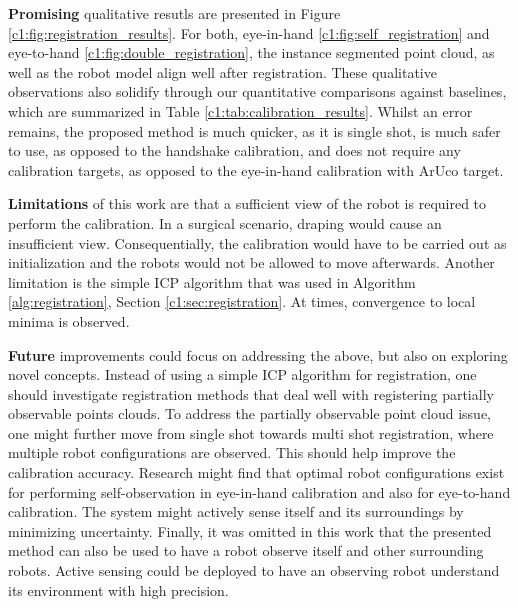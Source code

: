 \textbf{Promising} qualitative resutls are presented in Figure \ref{c1:fig:registration_results}. For both, eye-in-hand \ref{c1:fig:self_registration} and eye-to-hand \ref{c1:fig:double_registration}, the instance segmented point cloud, as well as the robot model align well after registration. These qualitative observations also solidify through our quantitative comparisons against baselines, which are summarized in Table \ref{c1:tab:calibration_results}. Whilst an error remains, the proposed method is much quicker, as it is single shot, is much safer to use, as opposed to the handshake calibration, and does not require any calibration targets, as opposed to the eye-in-hand calibration with ArUco target.

\textbf{Limitations} of this work are that a sufficient view of the robot is required to perform the calibration. In a surgical scenario, draping would cause an insufficient view. Consequentially, the calibration would have to be carried out as initialization and the robots would not be allowed to move afterwards. Another limitation is the simple ICP algorithm that was used in Algorithm \ref{alg:registration}, Section \ref{c1:sec:registration}. At times, convergence to local minima is observed.

\textbf{Future} improvements could focus on addressing the above, but also on exploring novel concepts. Instead of using a simple ICP algorithm for registration, one should investigate registration methods that deal well with registering partially observable points clouds. To address the partially observable point cloud issue, one might further move from single shot towards multi shot registration, where multiple robot configurations are observed. This should help improve the calibration accuracy. Research might find that optimal robot configurations exist for performing self-observation in eye-in-hand calibration and also for eye-to-hand calibration. The system might actively sense itself and its surroundings by minimizing uncertainty. Finally, it was omitted in this work that the presented method can also be used to have a robot observe itself and other surrounding robots. Active sensing could be deployed to have an observing robot understand its environment with high precision.
